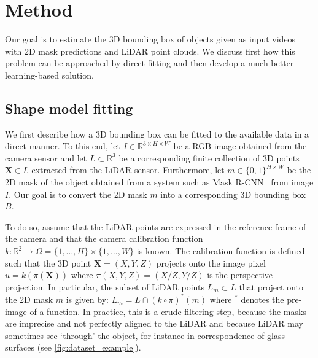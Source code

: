 \newcommand{\X}{\mathbf{X}}
\section{Method}\label{s:method}



Our goal is to estimate the 3D bounding box of objects given as input videos with 2D mask predictions and LiDAR point clouds.
We discuss first how this problem can be approached by direct fitting and then develop a much better learning-based solution.

\subsection{Shape model fitting}\label{s:shapemodel}

We first describe how a 3D bounding box can be fitted to the available data in a direct manner.
To this end, let $I \in \mathbb{R}^{3\times H\times W}$ be a RGB image obtained from the camera sensor and let $L \subset\mathbb{R}^3$ be a corresponding finite collection of 3D points $\X\in L$ extracted from the LiDAR sensor.
Furthermore, let $m \in \{0,1\}^{H \times W}$ be the 2D mask of the object obtained from a system such as Mask R-CNN~\cite{he17mask} from image $I$.
Our goal is to convert the 2D mask $m$ into a corresponding 3D bounding box $B$.

To do so, assume that the LiDAR points are expressed in the reference frame of the camera and that the camera calibration function $k : \mathbb{R}^2 \rightarrow \Omega = \{1,\dots,H\}\times\{1,\dots,W\}$ is known.
The calibration function is defined such that the 3D point $\X=(X,Y,Z)$ projects onto the image pixel $u = k(\pi(\X))$ where $\pi(X,Y,Z)=(X/Z,Y/Z)$ is the perspective projection.
In particular, the subset of LiDAR points $L_m \subset L$ that project onto the 2D mask $m$ is given by:
$
L_m
=
L \cap
(k \circ \pi)^*(m)
$
where ${}^*$ denotes the pre-image of a function.
In practice, this is a crude filtering step, because the masks are imprecise and not perfectly aligned to the LiDAR and because LiDAR may sometimes see `through' the object, for instance in correspondence of glass surfaces
(see \cref{fig:dataset_example}).

